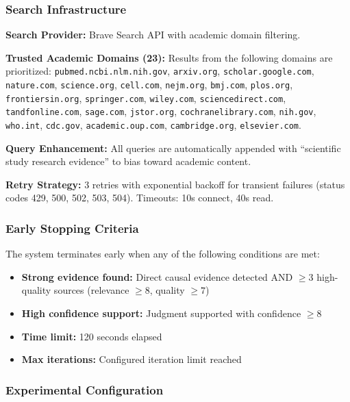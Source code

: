 \subsubsection{Search Infrastructure}

\textbf{Search Provider:} Brave Search API with academic domain filtering.

\textbf{Trusted Academic Domains (23):} Results from the following domains are prioritized: \texttt{pubmed.ncbi.nlm.nih.gov}, \texttt{arxiv.org}, \texttt{scholar.google.com}, \texttt{nature.com}, \texttt{science.org}, \texttt{cell.com}, \texttt{nejm.org}, \texttt{bmj.com}, \texttt{plos.org}, \texttt{frontiersin.org}, \texttt{springer.com}, \texttt{wiley.com}, \texttt{sciencedirect.com}, \texttt{tandfonline.com}, \texttt{sage.com}, \texttt{jstor.org}, \texttt{cochranelibrary.com}, \texttt{nih.gov}, \texttt{who.int}, \texttt{cdc.gov}, \texttt{academic.oup.com}, \texttt{cambridge.org}, \texttt{elsevier.com}.

\textbf{Query Enhancement:} All queries are automatically appended with ``scientific study research evidence'' to bias toward academic content.

\textbf{Retry Strategy:} 3 retries with exponential backoff for transient failures (status codes 429, 500, 502, 503, 504). Timeouts: 10s connect, 40s read.

\subsubsection{Early Stopping Criteria}

The system terminates early when any of the following conditions are met:
\begin{itemize}[noitemsep]
    \item \textbf{Strong evidence found:} Direct causal evidence detected AND $\geq$3 high-quality sources (relevance $\geq 8$, quality $\geq 7$)
    \item \textbf{High confidence support:} Judgment supported with confidence $\geq 8$
    \item \textbf{Time limit:} 120 seconds elapsed
    \item \textbf{Max iterations:} Configured iteration limit reached
\end{itemize}

\subsubsection{Experimental Configuration}

